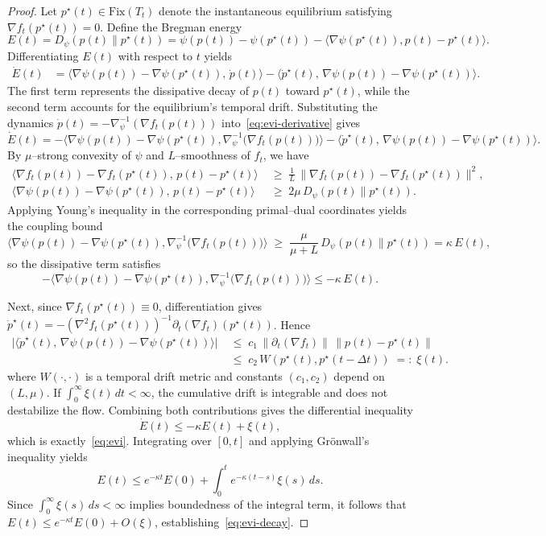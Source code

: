 \documentclass[11pt]{article}
\theoremstyle{plain}
\theoremstyle{definition}
\theoremstyle{remark}
\begin{document}
\begin{proof}
Let $p^\star(t)\in\mathrm{Fix}(T_t)$ denote the instantaneous equilibrium satisfying $\nabla f_t(p^\star(t))=0$.  
Define the Bregman energy
\[
E(t)=D_\psi(p(t)\|p^\star(t))
=\psi(p(t))-\psi(p^\star(t))
-\langle\nabla\psi(p^\star(t)),p(t)-p^\star(t)\rangle.
\]
Differentiating $E(t)$ with respect to $t$ yields
\begin{align}
\dot E(t)
&=\langle\nabla\psi(p(t))-\nabla\psi(p^\star(t)),\,\dot p(t)\rangle
-\langle\dot p^\star(t),\,\nabla\psi(p(t))-\nabla\psi(p^\star(t))\rangle.
\label{eq:evi-derivative}
\end{align}
The first term represents the dissipative decay of $p(t)$ toward $p^\star(t)$, while the second term accounts for the equilibrium’s temporal drift.  
Substituting the dynamics $\dot p(t)=-\nabla_{\!\psi}^{-1}(\nabla f_t(p(t)))$ into~\eqref{eq:evi-derivative} gives
\[
\dot E(t)
=-\big\langle\nabla\psi(p(t))-\nabla\psi(p^\star(t)),
\nabla_{\!\psi}^{-1}\!\big(\nabla f_t(p(t))\big)\big\rangle
-\big\langle\dot p^\star(t),\,\nabla\psi(p(t))-\nabla\psi(p^\star(t))\big\rangle.
\]
By $\mu$–strong convexity of $\psi$ and $L$–smoothness of $f_t$, we have
\[
\begin{aligned}
\langle\nabla f_t(p(t))-\nabla f_t(p^\star(t)),\,p(t)-p^\star(t)\rangle
&\;\ge\;\frac{1}{L}\,\|\nabla f_t(p(t))-\nabla f_t(p^\star(t))\|^2,\\[4pt]
\langle\nabla\psi(p(t))-\nabla\psi(p^\star(t)),\,p(t)-p^\star(t)\rangle
&\;\ge\;2\mu\,D_\psi(p(t)\|p^\star(t)).
\end{aligned}
\]
Applying Young’s inequality in the corresponding primal–dual coordinates yields the coupling bound
\[
\big\langle\nabla\psi(p(t))-\nabla\psi(p^\star(t)),
\nabla_{\!\psi}^{-1}\!\big(\nabla f_t(p(t))\big)\big\rangle
\;\ge\;
\frac{\mu}{\mu+L}\,D_\psi(p(t)\|p^\star(t))
=\kappa\,E(t),
\]
so the dissipative term satisfies
\[
-\big\langle\nabla\psi(p(t))-\nabla\psi(p^\star(t)),
\nabla_{\!\psi}^{-1}\!\big(\nabla f_t(p(t))\big)\big\rangle
\le -\kappa\,E(t).
\]

Next, since $\nabla f_t(p^\star(t))\equiv 0$, differentiation gives
$\dot p^\star(t)=-(\nabla^2 f_t(p^\star(t)))^{-1}\partial_t(\nabla f_t)(p^\star(t))$.
Hence
\[
\begin{aligned}
\big|\langle\dot p^\star(t),\,\nabla\psi(p(t))-\nabla\psi(p^\star(t))\rangle\big|
&\;\le\;
c_1\,\|\partial_t(\nabla f_t)\|\,\|p(t)-p^\star(t)\|\\[4pt]
&\;\le\;
c_2\,W(p^\star(t),p^\star(t-\Delta t))
\;=:\;\xi(t).
\end{aligned}
\]
where $W(\cdot,\cdot)$ is a temporal drift metric and constants $(c_1,c_2)$ depend on $(L,\mu)$.  
If $\int_0^\infty\xi(t)\,dt<\infty$, the cumulative drift is integrable and does not destabilize the flow.  
Combining both contributions gives the differential inequality
\[
\dot E(t)\le -\kappa E(t)+\xi(t),
\]
which is exactly~\eqref{eq:evi}.  
Integrating over $[0,t]$ and applying Grönwall’s inequality yields
\[
E(t)\le e^{-\kappa t}E(0)
+\int_0^t e^{-\kappa(t-s)}\xi(s)\,ds.
\]
Since $\int_0^\infty\xi(s)\,ds<\infty$ implies boundedness of the integral term,  
it follows that $E(t)\le e^{-\kappa t}E(0)+O(\xi)$, establishing~\eqref{eq:evi-decay}.
\end{proof}
\end{document}
